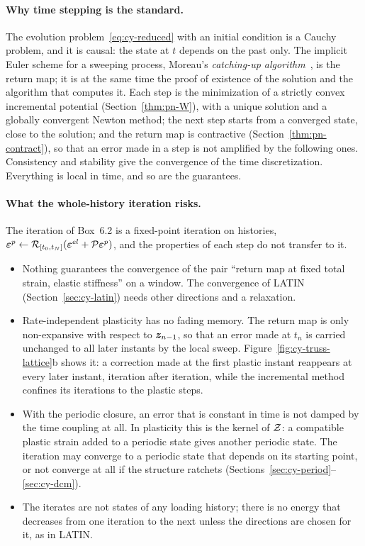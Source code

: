 \paragraph{Why time stepping is the standard.}
The evolution problem~\eqref{eq:cy-reduced} with an initial condition is a
Cauchy problem, and it is causal: the state at $t$ depends on the past only.
The implicit Euler scheme for a sweeping process, Moreau's \emph{catching-up
algorithm}~\cite{Moreau1977}, is the return map; it is at the same time the
proof of existence of the solution and the algorithm that computes it. Each
step is the minimization of a strictly convex incremental potential
(Section~\ref{thm:pn-W}), with a unique solution and a globally convergent
Newton method; the next step starts from a converged state, close to the
solution; and the return map is contractive
(Section~\ref{thm:pn-contract}), so that an error made in a step is not
amplified by the following ones. Consistency and stability give the
convergence of the time discretization. Everything is local in time, and so
are the guarantees.

\paragraph{What the whole-history iteration risks.}
%
The iteration of Box~6.2 is a fixed-point iteration on
histories, $\bm{\varepsilon}^{p}\gets\mathcal R_{[t_0,t_N]}(\bm{\varepsilon}^{el}+\mathcal{P}\bm{\varepsilon}^{p})$, and the
properties of each step do not transfer to it.
\begin{itemize}
  \item Nothing guarantees the convergence of the pair ``return map at fixed
  total strain, elastic stiffness'' on a window. The convergence of LATIN
  (Section~\ref{sec:cy-latin}) needs other directions and a relaxation.
  \item Rate-independent plasticity has no fading memory. The return map is
  only non-expansive with respect to $\bm{z}_{n-1}$, so that an error made at
  $t_n$ is carried unchanged to all later instants by the local sweep.
  Figure~\ref{fig:cy-truss-lattice}b shows it: a correction made at the first
  plastic instant reappears at every later instant, iteration after
  iteration, while the incremental method confines its iterations to the
  plastic steps.
  \item With the periodic closure, an error that is constant in time is not
  damped by the time coupling at all. In plasticity this is the kernel of
  $\mathcal{Z}$: a compatible plastic strain added to a periodic state gives another
  periodic state. The iteration may converge to a periodic state that depends
  on its starting point, or not converge at all if the structure ratchets
  (Sections~\ref{sec:cy-period}--\ref{sec:cy-dcm}).
  \item The iterates are not states of any loading history; there is no energy
  that decreases from one iteration to the next unless the directions are
  chosen for it, as in LATIN.
\end{itemize}

